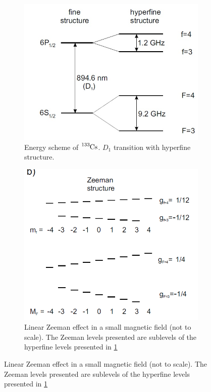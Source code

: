 \documentclass[a4paper,kulak]{kulakarticle} %
\begin{document}
\begin{figure}[h!]
	\centering
	\begin{subfigure}[L]{.5\textwidth}
		\centering
		\includegraphics[width=.7\linewidth]{hyperfine}
		\caption{Energy scheme of $\ce{^{133}Cs}$. $D_{1}$ transition with hyperfine structure.}
		\label{fig:hyperfine}
	\end{subfigure}%
	\begin{subfigure}[R]{.5\textwidth}
		\centering
		\includegraphics[width=.7\linewidth]{zeeman}
		\caption{Linear Zeeman effect in a small magnetic field (not to scale). The Zeeman levels presented are sublevels of the hyperfine levels presented in \ref{fig:hyperfine} }
		\label{fig:zeeman}
	\end{subfigure}
\end{figure}
\end{document}
